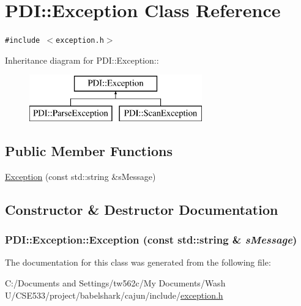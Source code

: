 \hypertarget{class_p_d_i_1_1_exception}{
\section{PDI::Exception Class Reference}
\label{class_p_d_i_1_1_exception}
}
{\tt \#include $<$exception.h$>$}

Inheritance diagram for PDI::Exception::\begin{figure}[H]
\begin{center}
\leavevmode
\includegraphics[height=2cm]{class_p_d_i_1_1_exception}
\end{center}
\end{figure}
\subsection*{Public Member Functions}
\begin{CompactItemize}
\item 
\hyperlink{class_p_d_i_1_1_exception_37c18778a96fb27627c58143a3bc5a95}{Exception} (const std::string \&sMessage)
\end{CompactItemize}


\subsection{Constructor \& Destructor Documentation}
\hypertarget{class_p_d_i_1_1_exception_37c18778a96fb27627c58143a3bc5a95}{
\subsubsection[{Exception}]{\setlength{\rightskip}{0pt plus 5cm}PDI::Exception::Exception (const std::string \& {\em sMessage})}}
\label{class_p_d_i_1_1_exception_37c18778a96fb27627c58143a3bc5a95}




The documentation for this class was generated from the following file:\begin{CompactItemize}
\item 
C:/Documents and Settings/tw562c/My Documents/Wash U/CSE533/project/babelshark/cajun/include/\hyperlink{exception_8h}{exception.h}\end{CompactItemize}
